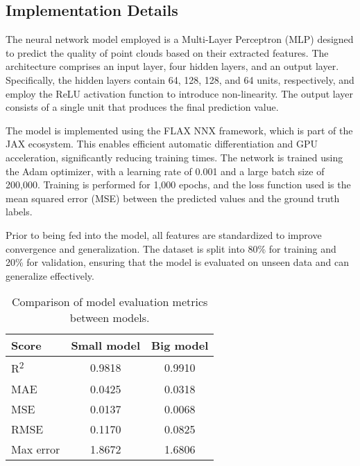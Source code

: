 \subsection{Implementation Details}

The neural network model employed is a Multi-Layer Perceptron (MLP) designed to predict the quality of point clouds based on their extracted features. The architecture comprises an input layer, four hidden layers, and an output layer. Specifically, the hidden layers contain 64, 128, 128, and 64 units, respectively, and employ the ReLU activation function to introduce non-linearity. The output layer consists of a single unit that produces the final prediction value.

The model is implemented using the FLAX NNX framework, which is part of the JAX ecosystem. This enables efficient automatic differentiation and GPU acceleration, significantly reducing training times. The network is trained using the Adam optimizer, with a learning rate of 0.001 and a large batch size of 200{,}000. Training is performed for 1{,}000 epochs, and the loss function used is the mean squared error (MSE) between the predicted values and the ground truth labels.

Prior to being fed into the model, all features are standardized to improve convergence and generalization. The dataset is split into 80\% for training and 20\% for validation, ensuring that the model is evaluated on unseen data and can generalize effectively.

\begin{table}[htbp]
\centering
\begin{tabular}{|l|c|c|}
\hline
\textbf{Score} & \textbf{Small model} & \textbf{Big model} \\
\hline
R\textsuperscript{2} & 0.9818 & 0.9910 \\
MAE & 0.0425 & 0.0318 \\
MSE & 0.0137 & 0.0068 \\
RMSE & 0.1170 & 0.0825 \\
Max error & 1.8672 & 1.6806 \\
\hline
\end{tabular}
\vspace{0.5em}  %
\caption{Comparison of model evaluation metrics between models.}
\label{tab:model_metrics}
\end{table}
